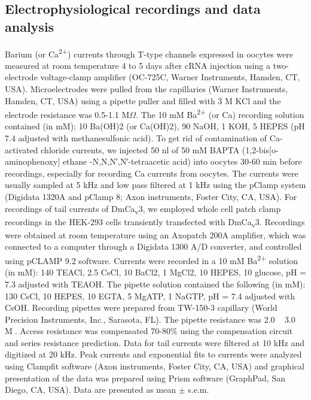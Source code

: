 \subsection*{Electrophysiological recordings and data analysis}

Barium (or Ca\textsuperscript{2+}) currents through T-type channels expressed in oocytes were measured at room temperature 4 to 5 days after cRNA injection using a two-electrode voltage-clamp amplifier (OC-725C, Warner Instruments, Hamden, CT, USA).
Microelectrodes were pulled from the capillaries (Warner Instruments, Hamden, CT, USA) using a pipette puller and filled with 3 M KCl and the electrode resistance was 0.5-1.1 M$\Omega$.
The 10 mM Ba\textsuperscript{2+} (or Ca) recording solution contained (in mM): 10 Ba(OH)2 (or Ca(OH)2), 90 NaOH, 1 KOH, 5 HEPES (pH 7.4 adjusted with methanesulfonic acid).
To get rid of contamination of Ca-activated chloride currents, we injected 50 nl of 50 mM BAPTA (1,2-bis$[$o-aminophenoxy$]$ ethane -N,N,N′,N′-tetraacetic acid) into oocytes 30-60 min before recordings, especially for recording Ca currents from oocytes.
The currents were usually sampled at 5 kHz and low pass filtered at 1 kHz using the pClamp system (Digidata 1320A and pClamp 8; Axon instruments, Foster City, CA, USA). 
For recordings of tail currents of DmCa\textsubscript{v}3, we employed whole cell patch clamp recordings in the HEK-293 cells transiently transfected with DmCa\textsubscript{v}3. 
Recordings were obtained at room temperature using an Axopatch 200A amplifier, which was connected to a computer through a Digidata 1300 A/D converter, and controlled using pCLAMP 9.2 software. 
Currents were recorded in a 10 mM Ba\textsuperscript{2+} solution (in mM): 140 TEACl, 2.5 CsCl, 10 BaCl2, 1 MgCl2, 10 HEPES, 10 glucose, pH = 7.3 adjusted with TEAOH. The pipette solution contained the following (in mM): 130 CsCl, 10 HEPES, 10 EGTA, 5 MgATP, 1 NaGTP, pH = 7.4 adjusted with CsOH. 
Recording pipettes were prepared from TW-150-3 capillary (World Precision Instruments, Inc., Sarasota, FL).
 The pipette resistance was 2.0 ~ 3.0 M. Access resistance was compensated 70-80$\%$ using the compensation circuit and series resistance prediction. 
Data for tail currents were filtered at 10 kHz and digitized at 20 kHz. 
Peak currents and exponential fits to currents were analyzed using Clampfit software (Axon instruments, Foster City, CA, USA) and graphical presentation of the data was prepared using Prism software (GraphPad, San Diego, CA, USA). 
Data are presented as mean $\pm$ s.e.m.
